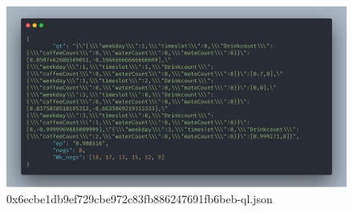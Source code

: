 \begin{figure}[th!]
    \centering
    \includegraphics[width=.9\columnwidth]{./Abbildungen/Kapitel_03/usr_json.png}
    \caption{0x6ecbe1db9ef729cbe972c83fb886247691fb6beb-ql.json}
    \label{img:abb1}
\end{figure}


